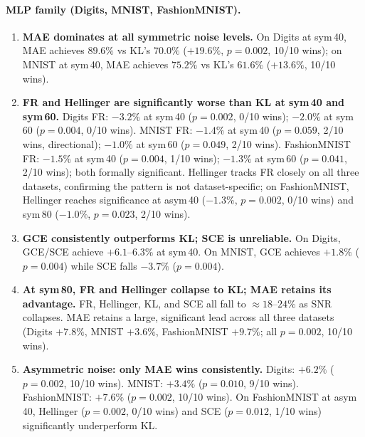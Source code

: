 \documentclass[11pt]{article}
\begin{document}
\paragraph{MLP family (Digits, MNIST, FashionMNIST).}
\begin{enumerate}
  \item \textbf{MAE dominates at all symmetric noise levels.}
    On Digits at sym\,40, MAE achieves $89.6\%$ vs KL's $70.0\%$ ($+19.6\%$,
    $p=0.002$, 10/10 wins); on MNIST at sym\,40, MAE achieves $75.2\%$ vs
    KL's $61.6\%$ ($+13.6\%$, 10/10 wins).
  \item \textbf{FR and Hellinger are significantly worse than KL at sym\,40 and sym\,60.}
    Digits FR: $-3.2\%$ at sym\,40 ($p=0.002$, 0/10 wins);
    $-2.0\%$ at sym\,60 ($p=0.004$, 0/10 wins).
    MNIST FR: $-1.4\%$ at sym\,40 ($p=0.059$, 2/10 wins, directional);
    $-1.0\%$ at sym\,60 ($p=0.049$, 2/10 wins).
    FashionMNIST FR: $-1.5\%$ at sym\,40 ($p=0.004$, 1/10 wins);
    $-1.3\%$ at sym\,60 ($p=0.041$, 2/10 wins); both formally significant.
    Hellinger tracks FR closely on all three datasets, confirming the pattern is
    not dataset-specific; on FashionMNIST, Hellinger reaches significance at
    asym\,40 ($-1.3\%$, $p=0.002$, 0/10 wins) and sym\,80 ($-1.0\%$, $p=0.023$, 2/10 wins).
  \item \textbf{GCE consistently outperforms KL; SCE is unreliable.}
    On Digits, GCE/SCE achieve $+6.1$--$6.3\%$ at sym\,40.
    On MNIST, GCE achieves $+1.8\%$ ($p=0.004$) while SCE falls $-3.7\%$ ($p=0.004$).
  \item \textbf{At sym\,80, FR and Hellinger collapse to KL; MAE retains its advantage.}
    FR, Hellinger, KL, and SCE all fall to $\approx 18$--$24\%$ as SNR collapses.
    MAE retains a large, significant lead across all three datasets
    (Digits $+7.8\%$, MNIST $+3.6\%$, FashionMNIST $+9.7\%$; all $p=0.002$, 10/10 wins).
  \item \textbf{Asymmetric noise: only MAE wins consistently.}
    Digits: $+6.2\%$ ($p=0.002$, 10/10 wins). MNIST: $+3.4\%$ ($p=0.010$, 9/10 wins).
    FashionMNIST: $+7.6\%$ ($p=0.002$, 10/10 wins).
    On FashionMNIST at asym\,40, Hellinger ($p=0.002$, 0/10 wins) and SCE ($p=0.012$, 1/10 wins)
    significantly underperform KL.
\end{enumerate}
\end{document}
